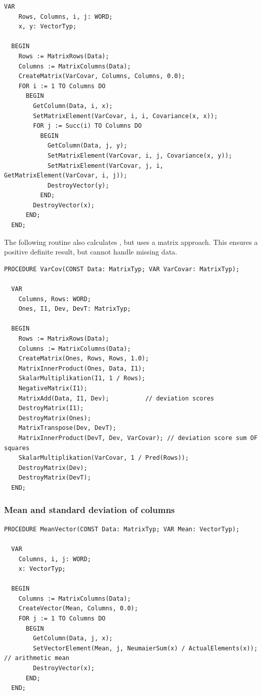 \begin{refsection}
\begin{lstlisting}[caption=Variance-covariance matrix]
  VAR
    Rows, Columns, i, j: WORD;
    x, y: VectorTyp;

  BEGIN
    Rows := MatrixRows(Data);
    Columns := MatrixColumns(Data);
    CreateMatrix(VarCovar, Columns, Columns, 0.0);
    FOR i := 1 TO Columns DO
      BEGIN
        GetColumn(Data, i, x);
        SetMatrixElement(VarCovar, i, i, Covariance(x, x));
        FOR j := Succ(i) TO Columns DO
          BEGIN
            GetColumn(Data, j, y);
            SetMatrixElement(VarCovar, i, j, Covariance(x, y));
            SetMatrixElement(VarCovar, j, i, GetMatrixElement(VarCovar, i, j));
            DestroyVector(y);
          END;
        DestroyVector(x);
      END;
  END;
\end{lstlisting}

The following routine also calculates , but uses a matrix approach. This ensures a positive definite result, but cannot handle missing data.

\begin{lstlisting}[caption=Variance-covariance matrix]
  PROCEDURE VarCov(CONST Data: MatrixTyp; VAR VarCovar: MatrixTyp);

  VAR
    Columns, Rows: WORD;
    Ones, I1, Dev, DevT: MatrixTyp;

  BEGIN
    Rows := MatrixRows(Data);
    Columns := MatrixColumns(Data);
    CreateMatrix(Ones, Rows, Rows, 1.0);
    MatrixInnerProduct(Ones, Data, I1);
    SkalarMultiplikation(I1, 1 / Rows);
    NegativeMatrix(I1);
    MatrixAdd(Data, I1, Dev);          // deviation scores
    DestroyMatrix(I1);
    DestroyMatrix(Ones);
    MatrixTranspose(Dev, DevT);
    MatrixInnerProduct(DevT, Dev, VarCovar); // deviation score sum OF squares
    SkalarMultiplikation(VarCovar, 1 / Pred(Rows));
    DestroyMatrix(Dev);
    DestroyMatrix(DevT);
  END;
\end{lstlisting}

\subsubsection{Mean and standard deviation of columns}

\begin{lstlisting}[caption=Column means of a matrix]
  PROCEDURE MeanVector(CONST Data: MatrixTyp; VAR Mean: VectorTyp);

  VAR
    Columns, i, j: WORD;
    x: VectorTyp;

  BEGIN
    Columns := MatrixColumns(Data);
    CreateVector(Mean, Columns, 0.0);
    FOR j := 1 TO Columns DO
      BEGIN
        GetColumn(Data, j, x);
        SetVectorElement(Mean, j, NeumaierSum(x) / ActualElements(x)); // arithmetic mean
        DestroyVector(x);
      END;
  END;
\end{lstlisting}



\end{refsection}
